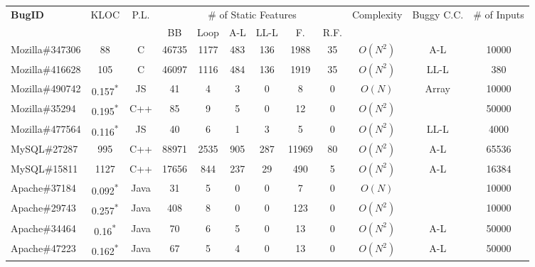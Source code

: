 \begin{table}[h!]
  \centering
  \scriptsize
  \newcommand{\Yes}[1]{\checkmark{}$_#1$}
  \newcommand{\No}[0]{-}
  \begin{tabular}{lccccccccccc}
    \toprule     
    {\bf BugID}                   & KLOC  &  P.L.    & \multicolumn{6}{c}{\# of Static Features}    &   Complexity  & Buggy C.C.        & \# of Inputs \\
                           
    \cmidrule(lr){4-9}
                                 &        &          &  BB      &  Loop     & A-L    &  LL-L    &  F.  & R.F.    &           &        &  \\
    \midrule 

    Mozilla\#347306              &  88    & C        &   46735  &   1177     &  483    &  136    &  1988  & 35   &  $O(N^{2})$ &  A-L  & 10000   \\
    Mozilla\#416628              &  105   & C        &   46097  &   1116     &  484    &  136    &  1919  &  35  &  $O(N^{2})$  &  LL-L & 380  \\
    Mozilla\#490742              &  0.157\textsuperscript{*}  & JS  &  41 & 4 &  3  &   0   &  8   &  0   & $O(N)$   &  Array  &  10000              \\
    Mozilla\#35294    &  0.195\textsuperscript{*}  & C++  & 85 &  9  &  5  & 0  & 12   & 0  &  $O(N^{2})$  &  & 50000  \\
    Mozilla\#477564   &  0.116\textsuperscript{*}  & JS  & 40 & 6 & 1 & 3 & 5   & 0  & $O(N^{2})$  & LL-L & 4000       \\
    \midrule
    MySQL\#27287      &  995  & C++  & 88971  & 2535 & 905 & 287 & 11969 & 80 & $O(N^{2})$ & A-L & 65536            \\
    MySQL\#15811      &  1127 & C++  & 17656 & 844 & 237 & 29 & 490 & 5 &  $O(N^{2})$ & A-L & 16384 \\
    \midrule
    Apache\#37184     &  0.092\textsuperscript{*} & Java  & 31 & 5  & 0 & 0 & 7 & 0  & $O(N)$  & & 10000     \\ 
    Apache\#29743     &  0.257\textsuperscript{*}  & Java  & 408 & 8 & 0 & 0 & 123 & 0 & $O(N^{2})$ & & 10000 \\
    Apache\#34464     &  0.16\textsuperscript{*}  & Java  & 70 & 6 & 5 & 0  & 13 & 0 & $O(N^{2})$ & A-L & 50000 \\
    Apache\#47223     &  0.162\textsuperscript{*} & Java  & 67 & 5 & 4 & 0  & 13 & 0 & $O(N^{2})$ & A-L & 50000 \\
    \midrule

\end{tabular}
\end{table}
